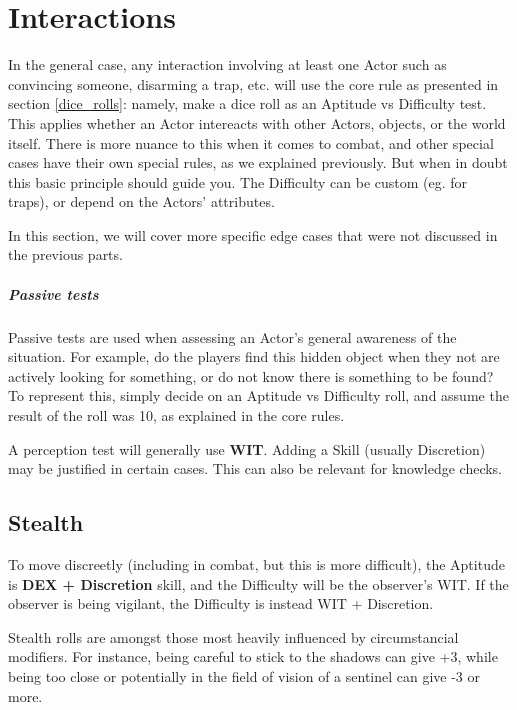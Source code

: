 
\chapter{Interactions}

In the general case, any interaction involving at least one Actor such as convincing someone, disarming a trap, etc. will use the core rule as presented in section \ref{dice_rolls}: namely, make a dice roll as an Aptitude vs Difficulty test. This applies whether an Actor intereacts with other Actors, objects, or the world itself. There is more nuance to this when it comes to combat, and other special cases have their own special rules, as we explained previously. But when in doubt this basic principle should guide you. The Difficulty can be custom (eg. for traps), or depend on the Actors' attributes.

In this section, we will cover more specific edge cases that were not discussed in the previous parts.

\paragraph{Passive tests}

Passive tests are used when assessing an Actor's general awareness of the situation. For example, do the players find this hidden object when they not are actively looking for something, or do not know there is something to be found? To represent this, simply decide on an Aptitude vs Difficulty roll, and assume the result of the roll was 10, as explained in the core rules.

A perception test will generally use \textbf{WIT}. Adding a Skill (usually Discretion) may be justified in certain cases. This can also be relevant for knowledge checks.

\section{Stealth}

To move discreetly (including in combat, but this is more difficult), the Aptitude is \textbf{DEX + Discretion} skill, and the Difficulty will be the observer's WIT. If the observer is being vigilant, the Difficulty is instead WIT + Discretion.

Stealth rolls are amongst those most heavily influenced by circumstancial modifiers. For instance, being careful to stick to the shadows can give +3, while being too close or potentially in the field of vision of a sentinel can give -3 or more.

